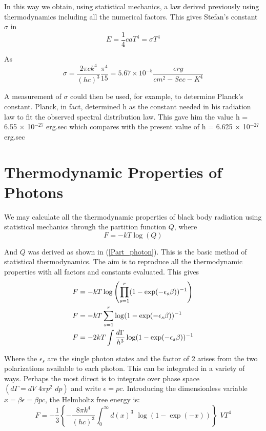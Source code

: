 \documentclass[book.tex]{subfiles}
\begin{document}
In this way we obtain, using statistical mechanics, a law derived previously using thermodynamics including all the numerical factors. This gives Stefan's constant $\sigma$ in 
\begin{equation}\label{Eq36}
E = \frac{1}{4} caT^{4} = \sigma T^{4}
\end{equation}

As
\begin{equation}\label{Eq37}
\sigma =  \frac{2\pi ck^{4}}{(hc)^{3}} \frac{\pi^{4}}{15} = 5.67 \times 10^{-5} \frac{erg}{cm^{2}-Sec-K^{4}}
\end{equation}

A measurement of $\sigma$ could then be used, for example, to determine Planck's constant. Planck, in fact, determined h as the constant needed in his radiation law to fit the observed spectral distribution law. This gave him the value h = 6.55 $\times$ 10$^{-27}$ erg.sec which compares with the present value of h = 6.625 $\times$ 10$^{-27}$ erg.sec

\section{Thermodynamic Properties of Photons}
We may calculate all the thermodynamic properties of black body radiation using statistical mechanics through the partition function $Q$, where
\begin{equation}\label{Eq38}
F =  -kT\log(Q)
\end{equation}

And $Q$ was derived as shown in (\ref{Part_photon}). This is the basic method of statistical thermodynamics. The aim is to reproduce all the thermodynamic properties with all factors and constants evaluated. This gives
\begin{align}\label{Eq39}
F &=  -kT\log\left(\prod_{s=1}^{r} (1-\exp(-\epsilon_{s}\beta))^{-1}\right) \notag \\
F &=  -kT\sum_{s=1}^{r} \log(1-\exp(-\epsilon_{s}\beta))^{-1} \notag \\
F &= -2kT  \int \frac{d\Gamma}{h^{3}} \log (1-\exp(-\epsilon_{s}\beta))^{-1} 
\end{align}

Where the $\epsilon_{s}$ are the single photon states and the factor of 2 arises from the two polarizations available to each photon. This can be integrated in a variety of ways. Perhaps the most direct is to integrate over phase space $(d\Gamma=dV\,\,4\pi p^{2}\,\,dp)$ and write $\epsilon=pc$. Introducing the dimensionless variable $x = \beta \epsilon = \beta pc$, the Helmholtz free energy is:
\begin{equation}\label{Eq40}
F = -\frac{1}{3} \left\lbrace -\frac{8\pi k^{4}}{(hc)^{3}} \int_{0}^{\infty} d(x)^{3} \,\, \log(1-\exp(-x)) \right\rbrace \,\, VT^{4}  
\end{equation}
\end{document}
